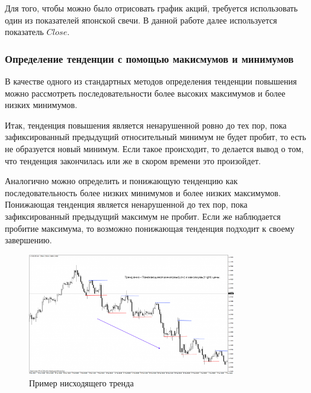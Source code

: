\documentclass[bachelor, och, coursework]{SCWorks}
\begin{document}
            Для того, чтобы можно было отрисовать график акций, требуется использовать
            один из показателей японской свечи. В данной работе далее используется 
            показатель $Close$.

            \subsubsection{Определение тенденции с помощью макисмумов и минимумов}

                В качестве одного из стандартных методов определения тенденции
                повышения можно рассмотреть последовательности более высоких
                максимумов и более низких минимумов.    

                Итак, тенденция повышения является ненарушенной ровно до тех пор, 
                пока зафиксированный предыдущий относительный минимум не будет
                пробит, то есть не образуется новый минимум. Если такое происходит, 
                то делается вывод о том, что тенденция закончилась или же в 
                скором времени это произойдет.

                Аналогично можно определить и понижающую тенденцию как
                последовательность более низких минимумов и более низких максимумов.
                Понижающая тенденция является ненарушенной до тех пор, пока
                зафиксированный предыдущий максимум не пробит. Если же наблюдается
                пробитие максимума, то возможно понижающая тенденция подходит к
                своему завершению.

                \begin{figure}[H]
                    \centering
                    \includegraphics[width=0.8\textwidth]{pic/trand.png}
                    \caption{Пример нисходящего тренда}
                \end{figure}
\end{document}
